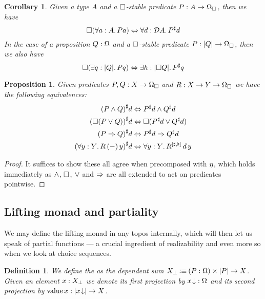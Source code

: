 \documentclass[11pt]{article}
\newtheorem{prop}[thrm]{Proposition}
\newtheorem{defn}[thrm]{Definition}
\newtheorem{coro}[thrm]{Corollary}
\begin{document}
\begin{coro}
  Given a type \(A\) and a \(\Box\)-stable predicate
  \(P:A\to\Omega_\Box\), then we have
  \[
    \Box{(\forall{a:A}.\,{Pa})}
    \Leftrightarrow
    \forall{d:\mathcal{D}{A}}.\,{{P}^\sharp d}
  \]
  In the case of a proposition \(Q:\Omega\) and
  a \(\Box\)-stable predicate \(P:|{Q}|\to\Omega_\Box\), then we also have
  \[
    \Box{(\exists{q:|{Q}|}.\,{Pq})}
    \Leftrightarrow
    \exists{h:|{\Box{Q}}|}.\,{{P}^\sharp q}
  \]
\end{coro}

\begin{prop}\label{prop:heyting-structure-predicate-extension}
  Given predicates \(P,Q : X \to \Omega_\Box\) and \(R : X \to Y \to \Omega_\Box\) we
  have the following equivalences:
  \begin{align*}
    {({P}\land{Q})}^\sharp d
    &\Leftrightarrow
      {{P}^\sharp d}\land{{Q}^\sharp d}
    \\
    {(\Box{({P}\lor{Q})})}^\sharp d
    &\Leftrightarrow
      \Box{({{P}^\sharp d}\lor{{Q}^\sharp d})}
    \\
    {({P}\Rightarrow{Q})}^\sharp d
    &\Leftrightarrow
      {{P}^\sharp d}\Rightarrow{{Q}^\sharp d}
    \\
    {(\forall{y:Y}.\,{R\,(-)\,y})}^\sharp d
    &\Leftrightarrow
      \forall{y:Y}.\,{{R}^{[{\sharp,\flat}]}\,d\,y}
  \end{align*}
\end{prop}
\begin{proof}
  It suffices to show these all agree when precomposed with \(\eta\), which
  holds immediately as \(\land\), \(\Box\), \(\lor\) and
  \(\Rightarrow\) are all extended to act on predicates pointwise.
\end{proof}

\subsection{Lifting monad and partiality}

We may define the lifting monad in any topos internally, which will then
let us speak of partial functions --- a crucial ingredient of realizability
and even more so when we look at choice sequences.

\begin{defn}\label{defn:lifting}
  We define the  as the dependent sum
  \({X}_\bot \mathbin{\vcentcolon\equiv} {(P : \Omega)}\times{|{P}|\to X}\).
  Given an element \(x : {X}_\bot\) we denote its first projection by
  \({{x}\!\downarrow} : \Omega\) and its second projection by
  \(\text{value}\,{x}: |{{{x}\!\downarrow}}| \to X\).
\end{defn}
\end{document}
